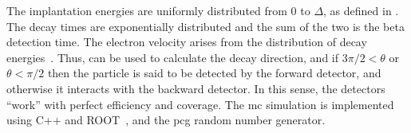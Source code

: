 The implantation energies are uniformly distributed from $0$ to $\Delta$, as defined in . The decay times are exponentially distributed and the sum of the two is the beta detection time. The electron velocity arises from the distribution of decay energies~\cite{Mougeot2015}. Thus,  can be used to calculate the decay direction, and if $3\pi/2<\theta$ or $\theta<\pi/2$ then the particle is said to be detected by the forward detector, and otherwise it interacts with the backward detector. In this sense, the detectors ``work'' with perfect efficiency and coverage. The \gls{mc} simulation is implemented using C++ and  ROOT~\cite{Antcheva2009a}, and the \gls{pcg} random number generator.
